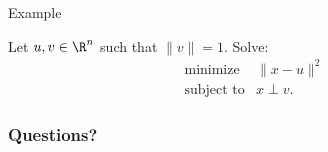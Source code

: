 \documentclass{beamer}
\begin{document}
\begin{frame}[t]{Example}
	\grid

	Let $u,v \in \R^n$ such that $\|v\|=1$. Solve:
	\begin{equation}
		\begin{array}{lll}
			\text{minimize} & \|x-u\|^2 & \\
			\text{subject to} & x \perp v.
		\end{array}
	\end{equation}

	\pause


\end{frame}

\appendix
\backupbegin
\begin{frame}[t]
	\frametitle{Questions?}
	\grid

	\pause
\end{frame}
\backupend
\end{document}
